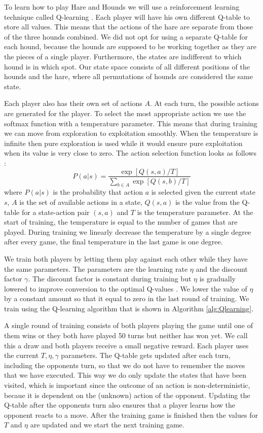 To learn how to play Hare and Hounds we will use a reinforcement learning
technique called Q-learning \cite{watkins1992q}.
Each player will have his own different
Q-table to store all values. This means that the actions of the hare are
separate from those of the three hounds combined. We did not opt for using
a separate Q-table for each hound, because the hounds are supposed to be
working together as they are the pieces of a single player. Furthermore,
the states are indifferent to which hound is in which spot. Our state space
consists of all different positions of the hounds and the hare, where all
permutations of hounds are considered the same state.

Each player also has their own set of actions $A$. At each turn, the possible
actions are generated for the player. To select the most appropriate action we
use  the softmax function with a temperature parameter. This means that during
training we can move from exploration to exploitation smoothly. When the
temperature is infinite then pure exploration is used while it would ensure
pure exploitation when its value is very close to zero. The action selection
function looks as follows \cite{alpaydin}:
\begin{equation}
   P(a|s) = \frac{\exp[Q(s,a)/T]}{\displaystyle\sum_{b \in A} \exp[Q(s, b)/T]}
\end{equation}
where $P(a|s)$ is the probability that action $a$ is selected given the
current state $s$, $A$ is the set of available actions in a state, $Q(s,a)$ is
the value from the Q-table for a state-action pair $(s,a)$ and $T$ is the
temperature parameter. At the start of training, the temperature is equal to
the number of games that are played. During training we linearly decrease the
temperature by a single degree after every game, the final temperature in the
last game is one degree.

We train both players by letting them play against each other while they have
the same parameters. The parameters are the learning rate $\eta$ and the
discount factor $\gamma$. The discount factor is constant during training but
$\eta$ is gradually lowered to improve conversion to the optimal
Q-values \cite{alpaydin}. We lower the value of $\eta$ by a constant amount so
that it equal to zero in the last round of training. We train using the
Q-learning algorithm that is shown in Algorithm \autoref{alg:Qlearning}.

A single round of training consists of both players playing the game until
one of them wins or they both have played 50 turns but neither has won yet.
We call this a draw and both players receive a small negative reward. Each
player uses the current $T, \eta, \gamma$ parameters. The Q-table gets
updated after each turn, including the opponents turn, so that we do not
have to remember the moves that we have executed. This way we do only
update the states that have been visited, which is important since the
outcome of an action is non-deterministic, becaue it is dependent on the
(unknown) action of the opponent. Updating the Q-table after the opponents
turn also ensures that a player learns how the opponent reacts to a move.
After the training game is finished then the values for $T$ and $\eta$ are
updated and we start the next training game.

